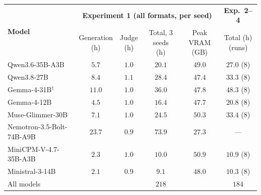 \begin{tabular}{lccccc}
\toprule
\multirow{2}{*}{\textbf{Model}} & \multicolumn{4}{c}{\textbf{Experiment 1 (all formats, per seed)}} & \textbf{Exp.\ 2--4} \\
\cmidrule(lr){2-5} \cmidrule(lr){6-6}
 & \makecell{Generation\\(h)} & \makecell{Judge\\(h)} & \makecell{Total, 3 seeds\\(h)} & \makecell{Peak VRAM\\(GB)} & \makecell{Total (h)\\(runs)} \\
\midrule
Qwen3.6-35B-A3B & $5.7$ & $1.0$ & $20.1$ & $49.0$ & $27.0$ (8) \\
Qwen3.8-27B & $8.4$ & $1.1$ & $28.4$ & $47.4$ & $33.3$ (8) \\
Gemma-4-31B$^\dagger$ & $11.0$ & $1.0$ & $36.0$ & $47.8$ & $48.3$ (8) \\
Gemma-4-12B & $4.5$ & $1.0$ & $16.4$ & $47.7$ & $20.8$ (8) \\
Muse-Glimmer-30B & $7.1$ & $1.0$ & $24.5$ & $50.3$ & $33.4$ (8) \\
Nemotron-3.5-Bolt-74B-A9B & $23.7$ & $0.9$ & $73.9$ & $27.3$ & --- \\
MiniCPM-V-4.7-35B-A3B & $2.3$ & $1.0$ & $10.0$ & $50.9$ & $10.9$ (8) \\
Ministral-3-14B & $2.1$ & $0.9$ & $9.1$ & $48.0$ & $10.3$ (8) \\
\midrule
All models & & & $218$ & & $184$ \\
\bottomrule
\end{tabular}
